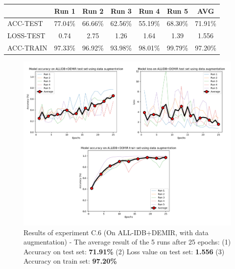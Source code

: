 \documentclass[11pt, openany]{report}
\theoremstyle{plain}
\theoremstyle{definition}
\theoremstyle{remark}
\begin{document}
\begin{center}
\begin{tabular}{|l|c|c|c|c|c|c|}
  \hline
   & \textbf{Run 1} & \textbf{Run 2} & \textbf{Run 3} & \textbf{Run 4} & \textbf{Run 5} & \textbf{AVG}\\
  \hline
  ACC-TEST & 77.04\% & 66.66\% & 62.56\% & 55.19\% & 68.30\% & 71.91\% \\
  LOSS-TEST & 0.74 & 2.75 & 1.26 & 1.64 & 1.39 & 1.556 \\ 
  ACC-TRAIN & 97.33\% & 96.92\% & 93.98\% & 98.01\% & 99.79\% & 97.20\% \\ 
  \hline
\end{tabular}
\label{table:results-C6}
\end{center}

\begin{figure}[H]
  \centering
  \includegraphics[scale=0.45]{Code/ch6-LeukemiaSubtypes/figures_result/LEUK-SUBTYPES/leukSub-data_aug.PNG}
  \caption{Results of experiment C.6 (On ALL-IDB+DEMIR, with data augmentation) - The average result of the 5 runs after 25 epochs: (1) Accuracy on test set: \textbf{71.91\%} (2) Loss value on test set: \textbf{1.556} (3) Accuracy on train set: \textbf{97.20\%}}
  \label{fig:results-C6}
\end{figure}
\end{document}

